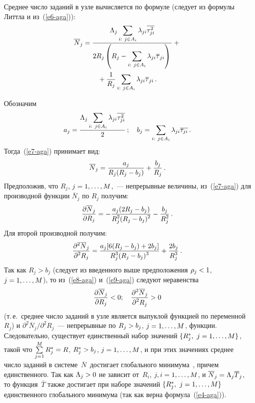 \begin{multicols}{2}
Среднее число заданий в узле вычисляется по формуле (следует из формулы
Литтла и из~(\ref{e6-aga})):
\begin{multline}
\overline{N}_j = \displaystyle\frac{\displaystyle \Lambda_j\sum\limits_{i:\ j\in A_i} \lambda_{ji}
\overline{\tau^2_{ji}}\mathstrut}{\displaystyle 2R_j \left(R_j-\sum\limits_{i:\ j\in A_i} \lambda_{ji}
\overline{\tau}_{ji}\right)\mathstrut}+{}\\
{}+\displaystyle\frac{\displaystyle 1\mathstrut}{\displaystyle R_j\mathstrut} \sum\limits_{i:\ j\in A_i} \lambda_{ji} \overline{\tau}_{ji}\,.
\label{e7-aga}
\end{multline}

Обозначим
$$
a_j= \displaystyle\frac{\displaystyle \Lambda_j \sum\limits_{i:\ j\in A_i} \lambda_{ji}
\overline{\tau^2_{ji}}\mathstrut}{\displaystyle 2\mathstrut}\,;\quad b_j=\sum\limits_{i:\ j\in A_i} \lambda_{ji}
\overline{\tau_{ji}}\,.
$$
Тогда~(\ref{e7-aga}) принимает вид:
$$
\overline{N}_j = \displaystyle\frac{\displaystyle a_j\mathstrut}{\displaystyle R_j(R_j-b_j)\mathstrut} +\displaystyle\frac{\displaystyle b_j\mathstrut}{\displaystyle R_j\mathstrut}\,.
$$
Предположив, что $R_j$, $j\hm= 1, \ldots , M$,~--- непрерывные величины,
из~(\ref{e7-aga}) для производной функции $\overline{N}_j$ по $R_j$ получим:
\begin{equation}
\displaystyle\frac{\displaystyle \partial \overline{N}_j\mathstrut}{\displaystyle \partial R_j\mathstrut} = - \displaystyle\frac{\displaystyle a_j (2R_j-b_j)\mathstrut}{\displaystyle R^2_j (R_j-b_j)^2\mathstrut}
- \displaystyle\frac{\displaystyle b_j\mathstrut}{\displaystyle R_j^2\mathstrut}\,.
\label{e8-aga}
\end{equation}
Для второй производной получим:
\begin{equation}
\displaystyle\frac{\displaystyle \partial^2 \overline{N}_j\mathstrut}{\displaystyle \partial^2 R_j\mathstrut} = \displaystyle\frac{\displaystyle a_j[6(R_j-b_j)+2b_j]\mathstrut}{\displaystyle R^3_j
(R_j-b_j)^3\mathstrut}+ \displaystyle\frac{\displaystyle 2b_j\mathstrut}{\displaystyle R_j^3\mathstrut}\,.
\label{e9-aga}
\end{equation}
Так как $R_j>b_j$ (следует из введенного выше предположения $\rho_j\hm<1$,
$j\hm= 1,\ldots , M$), то из~(\ref{e8-aga}) и~(\ref{e9-aga}) следуют неравенства
$$
\displaystyle\frac{\displaystyle \partial \overline{N}_j\mathstrut}{\displaystyle \partial R_j\mathstrut}<0;\quad
\displaystyle\frac{\displaystyle \partial^2\overline{N}_j\mathstrut}{\displaystyle \partial^2 R_j\mathstrut}>0
$$
(т.\,е.\ среднее число заданий в узле является вы\-пук\-лой функцией по
переменной~$R_j$) и $\partial^2\overline{N}_j/\partial^2 R_j$~--- непрерывные
по $R_j\hm>b_j$, $j\hm=1,\ldots , M$, функции. Следовательно, существует
единственный набор значений $\{R_j^*,\ j\hm= 1,\ldots , M\}$, такой что
$\sum\limits_{j=1}^M R_j^*\hm=R$, $R^*_j\hm>b_j$, $j\hm= 1,\ldots , M$, и при
этих значениях среднее число заданий в системе~$\overline{N}$~достигает
глобального минимума~\cite{12-aga}, причем единственного. Так как
$\Lambda_j\hm>0$ не зависит от~$R_i$, $j,i\hm= 1,\ldots , M$, и
$\overline{N}_j\hm= \Lambda_j \overline{T}_j$, то функция~$\overline{T}$
также достигает при наборе значений $\{R_j^*,\ j\hm= 1,\ldots , M\}$
единственного глобального минимума (так как верна формула~(\ref{e4-aga})).


\end{multicols}
